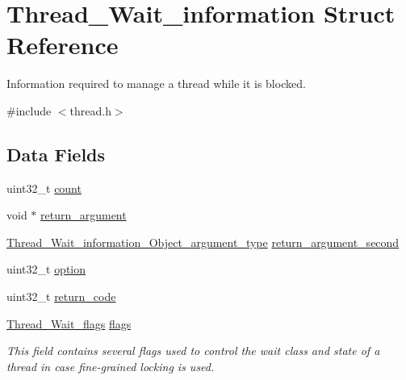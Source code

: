 \hypertarget{structThread__Wait__information}{}\section{Thread\+\_\+\+Wait\+\_\+information Struct Reference}
\label{structThread__Wait__information}


Information required to manage a thread while it is blocked.  




{\ttfamily \#include $<$thread.\+h$>$}

\subsection*{Data Fields}
\begin{DoxyCompactItemize}
\item 
uint32\+\_\+t \mbox{\hyperlink{structThread__Wait__information_a5d1ed6ffcab7db372e326fa698ce0b1b}{count}}
\item 
void $\ast$ \mbox{\hyperlink{structThread__Wait__information_ae0d09bf6f457e8ba3752e7c55bedad0c}{return\+\_\+argument}}
\item 
\mbox{\hyperlink{unionThread__Wait__information__Object__argument__type}{Thread\+\_\+\+Wait\+\_\+information\+\_\+\+Object\+\_\+argument\+\_\+type}} \mbox{\hyperlink{structThread__Wait__information_a8fcafd2a99ad39bb63c40dbf74131e6f}{return\+\_\+argument\+\_\+second}}
\item 
uint32\+\_\+t \mbox{\hyperlink{structThread__Wait__information_a5e34b3fb8e24749a4f531a1fb50a7624}{option}}
\item 
uint32\+\_\+t \mbox{\hyperlink{structThread__Wait__information_ae0bd8a5d994cd9a126073eb301c75a86}{return\+\_\+code}}
\item 
\mbox{\label{structThread__Wait__information_a76a6fef05558521f82874ceb5dbb8fbb}} 
\mbox{\hyperlink{group__RTEMSScoreThread_ga9a047ae9c77bc90a258203d4f2cc57db}{Thread\+\_\+\+Wait\+\_\+flags}} \mbox{\hyperlink{structThread__Wait__information_a76a6fef05558521f82874ceb5dbb8fbb}{flags}}
\begin{DoxyCompactList}\small\item\em This field contains several flags used to control the wait class and state of a thread in case fine-\/grained locking is used. \end{DoxyCompactList}\item 

\end{DoxyCompactItemize}
